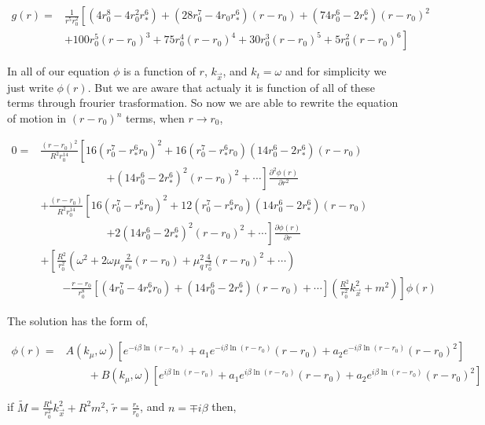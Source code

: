 \begin{align}
    g(r) =& \frac{1}{r^5r_0^2} \left[ (4r_0^8-4r_0^2r_*^6) + (28r_0^7-4r_0r_*^6)(r-r_0) + (74r_0^6-2r_*^6)(r-r_0)^2 \right. \nonumber\\
          &  \left. + 100r_0^5(r-r_0)^3 + 75r_0^4(r-r_0)^4 + 30r_0^3(r-r_0)^5 + 5r_0^2(r-r_0)^6 \right]
\end{align}

In all of our equation $\phi$ is a function of $r$, $k_{\vec{x}}$, and $k_t=\omega$ and for simplicity we just write $\phi(r)$. But we are aware that actualy it is function of all of these terms through frourier trasformation. So now we are able to rewrite the equation of motion in $(r-r_0)^n$ terms, when $r \rightarrow r_0$,

\begin{align}
    0 =& \frac{(r-r_0)^2}{R^2r_0^{14}}\left[16(r_0^7-r_*^6r_0)^2 + 16(r_0^7-r_*^6r_0)(14r_0^6-2r_*^6)(r-r_0) \right. \nonumber\\
       & \qquad \qquad \qquad  \left. + (14r_0^6-2r_*^6)^2(r-r_0)^2 + \cdots \right] \frac{\partial^2\phi(r)}{\partial r^2} \nonumber\\
       & + \frac{(r-r_0)}{R^2r_0^{14}}\left[16(r_0^7-r_*^6r_0)^2 + 12(r_0^7-r_*^6r_0)(14r_0^6-2r_*^6)(r-r_0) \right. \\
       & \qquad \qquad \qquad \left. + 2(14r_0^6-2r_*^6)^2(r-r_0)^2 + \cdots \right] \frac{\partial\phi(r)}{\partial r} \nonumber\\
       & + \left[ \frac{R^2}{r_0^2}\left(\omega^2+2\omega\mu_q\frac{2}{r_0}(r-r_0)+ \mu_q^2\frac{4}{r_0^2}(r-r_0)^2 +\cdots\right) \right. \nonumber\\
       & \qquad \left. - \frac{r-r_0}{r_0^8} \left[(4r_0^7-4r_*^6r_0) + (14r_0^6-2r_*^6)(r-r_0) + \cdots \right] \left( \frac{R^2}{r_0^2}k_{\vec{x}}^2 + m^2 \right) \right] \phi(r) \nonumber
\end{align}

The solution has the form of,

\begin{align}
    \phi(r) =& A(k_\mu,\omega)\left[e^{-i\beta\ln{(r-r_0)}}+a_1e^{-i\beta\ln{(r-r_0)}}(r-r_0)+ a_2e^{-i\beta\ln{(r-r_0)}}(r-r_0)^2\right] \nonumber\\
            & \qquad + B(k_\mu,\omega)\left[e^{i\beta\ln{(r-r_0)}}+a_1e^{i\beta\ln{(r-r_0)}}(r-r_0)+ a_2e^{i\beta\ln{(r-r_0)}}(r-r_0)^2\right]
\end{align}

if $\tilde{M} = \frac{R^4}{r_0^2}k_{\vec{x}}^2+R^2m^2$, $\tilde{r}=\frac{r_*}{r_0}$, and $n = \mp i\beta$ then,


